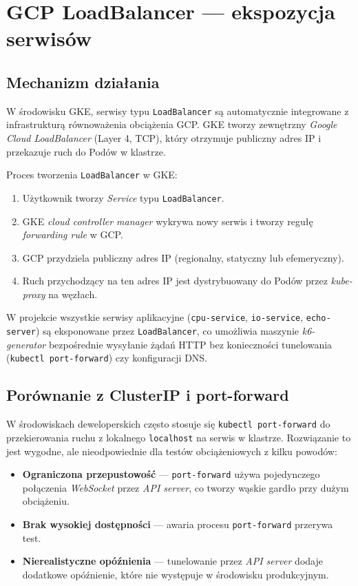 \section{GCP LoadBalancer — ekspozycja serwisów}

\subsection{Mechanizm działania}

W środowisku GKE, serwisy typu \texttt{LoadBalancer} są automatycznie integrowane z infrastrukturą równoważenia obciążenia GCP. GKE tworzy zewnętrzny \textit{Google Cloud LoadBalancer} (Layer 4, TCP), który otrzymuje publiczny adres IP i przekazuje ruch do Podów w klastrze.

Proces tworzenia \texttt{LoadBalancer} w GKE:
\begin{enumerate}
  \item Użytkownik tworzy \textit{Service} typu \texttt{LoadBalancer}.
  \item GKE \textit{cloud controller manager} wykrywa nowy serwis i tworzy regułę \textit{forwarding rule} w GCP.
  \item GCP przydziela publiczny adres IP (regionalny, statyczny lub efemeryczny).
  \item Ruch przychodzący na ten adres IP jest dystrybuowany do Podów przez \textit{kube-proxy} na węzłach.
\end{enumerate}

W projekcie wszystkie serwisy aplikacyjne (\texttt{cpu-service}, \texttt{io-service}, \texttt{echo-server}) są eksponowane przez \texttt{LoadBalancer}, co umożliwia maszynie \textit{k6-generator} bezpośrednie wysyłanie żądań HTTP bez konieczności tunelowania (\texttt{kubectl port-forward}) czy konfiguracji DNS.

\subsection{Porównanie z ClusterIP i port-forward}

W środowiskach deweloperskich często stosuje się \texttt{kubectl port-forward} do przekierowania ruchu z lokalnego \texttt{localhost} na serwis w klastrze. Rozwiązanie to jest wygodne, ale nieodpowiednie dla testów obciążeniowych z kilku powodów:
\begin{itemize}
  \item \textbf{Ograniczona przepustowość} — \texttt{port-forward} używa pojedynczego połączenia \textit{WebSocket} przez \textit{API server}, co tworzy wąskie gardło przy dużym obciążeniu.
  \item \textbf{Brak wysokiej dostępności} — awaria procesu \texttt{port-forward} przerywa test.
  \item \textbf{Nierealistyczne opóźnienia} — tunelowanie przez \textit{API server} dodaje dodatkowe opóźnienie, które nie występuje w środowisku produkcyjnym.
\end{itemize}


